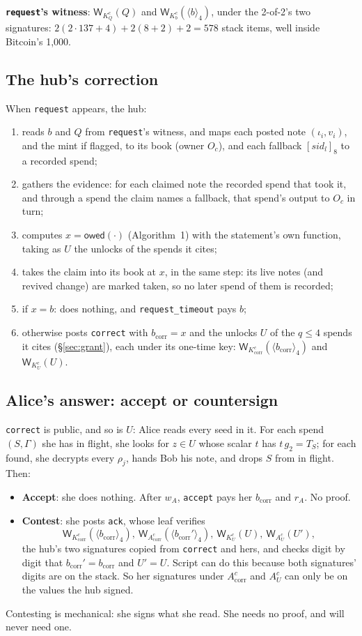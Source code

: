 \documentclass[11pt]{article}
\theoremstyle{plain}
\theoremstyle{definition}
\newcommand{\bcorr}{b_{\mathrm{corr}}}
\newcommand{\tx}[1]{\texttt{#1}}
\newcommand{\be}[2]{\langle #1\rangle_{#2}}
\newcommand{\pre}[2]{[#1]_{#2}}
\newcommand{\Wots}{\mathsf{W}}
\newcommand{\sid}{\mathit{sid}}
\newcommand{\owed}{\mathsf{owed}}
\newcommand{\Oc}{O_c}
\newcommand{\KQ}{K_{Q}^{c}}
\newcommand{\Kb}{K_{b}^{c}}
\newcommand{\Kcorr}{K_{\mathrm{corr}}^{c}}
\newcommand{\KU}{K_{U}^{c}}
\newcommand{\Acorr}{A_{\mathrm{corr}}^{c}}
\newcommand{\AU}{A_{U}^{c}}
\begin{document}
\textbf{\tx{request}'s witness}: $\Wots_{\KQ}(Q)$ and
$\Wots_{\Kb}(\be{b}{4})$, under the 2-of-2's two signatures: $2(2 \cdot
137 + 4) + 2(8 + 2) + 2 = 578$ stack items, well inside Bitcoin's
1,000.

\subsection{The hub's correction}\label{sec:correct}

When \tx{request} appears, the hub:
\begin{enumerate}[nosep]
\item reads $b$ and $Q$ from \tx{request}'s witness, and maps each posted
  note $(\iota_i, v_i)$, and the mint if flagged, to its book (owner
  $\Oc$), and each fallback
  $\pre{\sid_l}{8}$ to a recorded spend;
\item gathers the evidence: for each claimed note the recorded spend that
  took it, and through a spend the claim names a fallback, that spend's
  output to $\Oc$ in turn;
\item computes $x = \owed(\cdot)$ (Algorithm~1) with the statement's own
  function, taking as $U$ the unlocks of the spends it cites;
\item takes the claim into its book at $x$, in the same step: its live
  notes (and revived change) are marked taken, so no later spend of them
  is recorded;
\item if $x = b$: does nothing, and \tx{request\_timeout} pays $b$;
\item otherwise posts \tx{correct} with $\bcorr = x$ and the unlocks
  $U$ of the $q \le 4$ spends it cites (\S\ref{sec:grant}), each under
  its one-time key: $\Wots_{\Kcorr}(\be{\bcorr}{4})$ and
  $\Wots_{\KU}(U)$.
\end{enumerate}

\subsection{Alice's answer: accept or countersign}\label{sec:ack}

\tx{correct} is public, and so is $U$: Alice reads every seed in it.
For each spend $(S, \Gamma)$ she has in flight, she looks for $z \in U$
whose scalar $t$ has $t\,g_2 = T_S$; for each found, she decrypts every
$\rho_j$, hands Bob his note, and drops $S$ from in flight. Then:
\begin{itemize}[nosep]
\item \textbf{Accept}: she does nothing. After $w_A$, \tx{accept} pays
  her $\bcorr$ and $r_A$. No proof.
\item \textbf{Contest}: she posts \tx{ack}, whose leaf verifies
  \[
    \Wots_{\Kcorr}(\be{\bcorr}{4}),\ \Wots_{\Acorr}(\be{\bcorr'}{4}),\
    \Wots_{\KU}(U),\ \Wots_{\AU}(U'),
  \]
  the hub's two signatures copied from \tx{correct} and hers, and checks
  digit by digit that $\bcorr' = \bcorr$ and $U' = U$. Script can do
  this because both signatures' digits are on the stack. So her
  signatures under $\Acorr$ and $\AU$ can only be on the values the hub
  signed.
\end{itemize}
Contesting is mechanical: she signs what she read. She needs no proof,
and will never need one.
\end{document}
